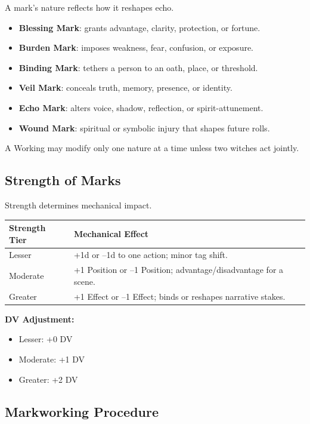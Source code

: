 \documentclass[11pt]{book}
\begin{document}
A mark's nature reflects how it reshapes echo.

\begin{itemize}[noitemsep]
    \item \textbf{Blessing Mark}: grants advantage, clarity, protection, or fortune.
    \item \textbf{Burden Mark}: imposes weakness, fear, confusion, or exposure.
    \item \textbf{Binding Mark}: tethers a person to an oath, place, or threshold.
    \item \textbf{Veil Mark}: conceals truth, memory, presence, or identity.
    \item \textbf{Echo Mark}: alters voice, shadow, reflection, or spirit-attunement.
    \item \textbf{Wound Mark}: spiritual or symbolic injury that shapes future rolls.
\end{itemize}

A Working may modify only one nature at a time unless two witches act jointly.

\subsection*{Strength of Marks}

Strength determines mechanical impact.

\begin{center}
\begin{longtable}{p{} p{}}
\toprule
\textbf{Strength Tier} & \textbf{Mechanical Effect} \\
\midrule
Lesser & +1d or --1d to one action; minor tag shift. \\
Moderate & +1 Position or --1 Position; advantage/disadvantage for a scene. \\
Greater & +1 Effect or --1 Effect; binds or reshapes narrative stakes. \\
\bottomrule
\end{longtable}
\end{center}

\textbf{DV Adjustment:}
\begin{itemize}[noitemsep]
    \item Lesser: +0 DV
    \item Moderate: +1 DV
    \item Greater: +2 DV
\end{itemize}

\subsection*{Markworking Procedure}
\end{document}
